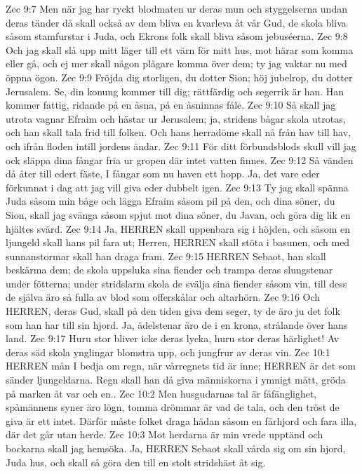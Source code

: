 Zec 9:7  Men när jag har ryckt blodmaten ur deras mun och styggelserna undan deras tänder då skall också av dem bliva en kvarleva åt vår Gud, de skola bliva såsom stamfurstar i Juda, och Ekrons folk skall bliva såsom jebuséerna.
Zec 9:8  Och jag skall slå upp mitt läger till ett värn för mitt hus, mot härar som komma eller gå, och ej mer skall någon plågare komma över dem; ty jag vaktar nu med öppna ögon.
Zec 9:9  Fröjda dig storligen, du dotter Sion; höj jubelrop, du dotter Jerusalem. Se, din konung kommer till dig; rättfärdig och segerrik är han. Han kommer fattig, ridande på en åsna, på en åsninnas fåle.
Zec 9:10  Så skall jag utrota vagnar Efraim och hästar ur Jerusalem; ja, stridens bågar skola utrotas, och han skall tala frid till folken. Och hans herradöme skall nå från hav till hav, och ifrån floden intill jordens ändar.
Zec 9:11  För ditt förbundsblods skull vill jag ock släppa dina fångar fria ur gropen där intet vatten finnes.
Zec 9:12  Så vänden då åter till edert fäste, I fångar som nu haven ett hopp. Ja, det vare eder förkunnat i dag att jag vill giva eder dubbelt igen.
Zec 9:13  Ty jag skall spänna Juda såsom min båge och lägga Efraim såsom pil på den, och dina söner, du Sion, skall jag svänga såsom spjut mot dina söner, du Javan, och göra dig lik en hjältes svärd.
Zec 9:14  Ja, HERREN skall uppenbara sig i höjden, och såsom en ljungeld skall hans pil fara ut; Herren, HERREN skall stöta i basunen, och med sunnanstormar skall han draga fram.
Zec 9:15  HERREN Sebaot, han skall beskärma dem; de skola uppsluka sina fiender och trampa deras slungstenar under fötterna; under stridslarm skola de svälja sina fiender såsom vin, till dess de själva äro så fulla av blod som offerskålar och altarhörn.
Zec 9:16  Och HERREN, deras Gud, skall på den tiden giva dem seger, ty de äro ju det folk som han har till sin hjord. Ja, ädelstenar äro de i en krona, strålande över hans land.
Zec 9:17  Huru stor bliver icke deras lycka, huru stor deras härlighet! Av deras säd skola ynglingar blomstra upp, och jungfrur av deras vin.
Zec 10:1  HERREN mån I bedja om regn, när vårregnets tid är inne; HERREN är det som sänder ljungeldarna. Regn skall han då giva människorna i ymnigt mått, gröda på marken åt var och en..
Zec 10:2  Men husgudarnas tal är fåfänglighet, spåmännens syner äro lögn, tomma drömmar är vad de tala, och den tröst de giva är ett intet. Därför måste folket draga hädan såsom en fårhjord och fara illa, där det går utan herde.
Zec 10:3  Mot herdarna är min vrede upptänd och bockarna skall jag hemsöka. Ja, HERREN Sebaot skall vårda sig om sin hjord, Juda hus, och skall så göra den till en stolt stridshäst åt sig.
